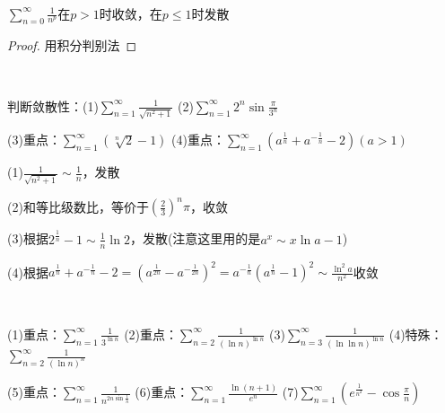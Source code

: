 ~

\begin{example}[常用比较对象]
  $\sum\limits_{n = 0}^{\infty}\frac{1}{n^p}$在$p > 1$时收敛，在$p \leq 1$时发散
\end{example}

\begin{proof}
  用积分判别法
\end{proof}

~

\begin{exercise}[使用等价无穷小]
  判断敛散性：(1)$\sum\limits_{n = 1}^{\infty} \frac{1}{\sqrt{n^2 + 1}}$
  (2)$\sum\limits_{n = 1}^{\infty} 2^n \sin \frac{\pi}{3^n}$

  (3)重点：$\sum\limits_{n = 1}^{\infty} (\sqrt[n]{2} - 1)$
  (4)重点：$\sum\limits_{n = 1}^{\infty} (a^{\frac{1}{n} } + a^{- \frac{1}{n}} - 2)(a > 1)$
\end{exercise}

\begin{solution}
  (1)$\frac{1}{\sqrt{n^2 + 1}} \sim \frac{1}{n}$，发散

  (2)和等比级数比，等价于$(\frac{2}{3})^n \pi$，收敛

  (3)根据$2^{\frac{1}{n}} - 1 \sim \frac{1}{n} \ln 2$，发散(注意这里用的是$a^x \sim x \ln a - 1$)

  (4)根据$a^{\frac{1}{n}} + a^{- \frac{1}{n}} - 2 = (a^{\frac{1}{2n}} - a^{-\frac{1}{2n}})^2 = a^{-\frac{1}{n}}(a^{\frac{1}{n}} - 1)^2 \sim \frac{\ln^2 a}{n^2}$收敛
\end{solution}

~

\begin{exercise}[含对数与指数]
  (1)重点：$\sum\limits_{n = 1}^{\infty} \frac{1}{3^{\ln n}}$
  (2)重点：$\sum\limits_{n = 2}^{\infty}\frac{1}{(\ln n)^{\ln n}}$
  (3)$\sum\limits_{n = 3}^{\infty} \frac{1}{(\ln \ln n)^{\ln n}}$
  (4)特殊：$\sum\limits_{n = 2}^{\infty}\frac{1}{(\ln n)^n}$

  (5)重点：$\sum\limits_{n = 1}^{\infty}\frac{1}{n^{2n \sin \frac{1}{n}}}$
  (6)重点：$\sum\limits_{n=1}^{\infty}\frac{\ln (n+1)}{e^n}$
  (7)$\sum\limits_{n = 1}^{\infty}(e^{\frac{1}{n^2}} - \cos \frac{\pi}{n})$
\end{exercise}


